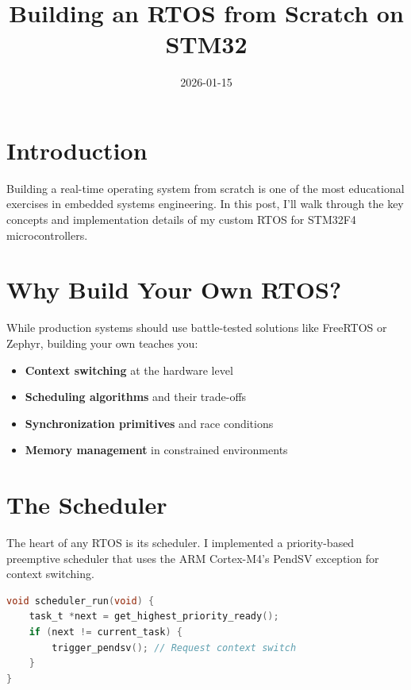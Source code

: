 \title{Building an RTOS from Scratch on STM32}
\date{2026-01-15}



\section{Introduction}

Building a real-time operating system from scratch is one of the most educational exercises in embedded systems engineering. In this post, I'll walk through the key concepts and implementation details of my custom RTOS for STM32F4 microcontrollers.

\section{Why Build Your Own RTOS?}

While production systems should use battle-tested solutions like FreeRTOS or Zephyr, building your own teaches you:

\begin{itemize}
  \item \textbf{Context switching} at the hardware level
  \item \textbf{Scheduling algorithms} and their trade-offs
  \item \textbf{Synchronization primitives} and race conditions
  \item \textbf{Memory management} in constrained environments
\end{itemize}

\section{The Scheduler}

The heart of any RTOS is its scheduler. I implemented a priority-based preemptive scheduler that uses the ARM Cortex-M4's PendSV exception for context switching.

\begin{lstlisting}[language=c]
void scheduler_run(void) {
    task_t *next = get_highest_priority_ready();
    if (next != current_task) {
        trigger_pendsv(); // Request context switch
    }
}
\end{lstlisting}

